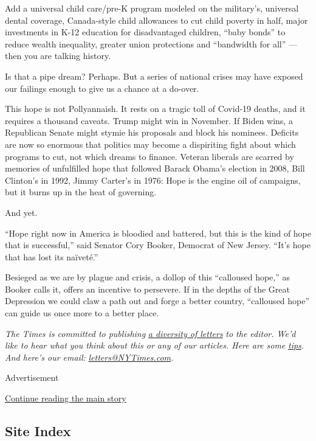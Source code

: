 Add a universal child care/pre-K program modeled on the military's,
universal dental coverage, Canada-style child allowances to cut child
poverty in half, major investments in K-12 education for disadvantaged
children, ``baby bonds'' to reduce wealth inequality, greater union
protections and ``bandwidth for all'' --- then you are talking history.

Is that a pipe dream? Perhaps. But a series of national crises may have
exposed our failings enough to give us a chance at a do-over.

This hope is not Pollyannaish. It rests on a tragic toll of Covid-19
deaths, and it requires a thousand caveats. Trump might win in November.
If Biden wins, a Republican Senate might stymie his proposals and block
his nominees. Deficits are now so enormous that politics may become a
dispiriting fight about which programs to cut, not which dreams to
finance. Veteran liberals are scarred by memories of unfulfilled hope
that followed Barack Obama's election in 2008, Bill Clinton's in 1992,
Jimmy Carter's in 1976: Hope is the engine oil of campaigns, but it
burns up in the heat of governing.

And yet.

``Hope right now in America is bloodied and battered, but this is the
kind of hope that is successful,'' said Senator Cory Booker, Democrat of
New Jersey. ``It's hope that has lost its naïveté.''

Besieged as we are by plague and crisis, a dollop of this ``calloused
hope,'' as Booker calls it, offers an incentive to persevere. If in the
depths of the Great Depression we could claw a path out and forge a
better country, ``calloused hope'' can guide us once more to a better
place.

\emph{The Times is committed to publishing}
\href{https://www.nytimes3xbfgragh.onion/2019/01/31/opinion/letters/letters-to-editor-new-york-times-women.html}{\emph{a
diversity of letters}} \emph{to the editor. We'd like to hear what you
think about this or any of our articles. Here are some}
\href{https://help.nytimes3xbfgragh.onion/hc/en-us/articles/115014925288-How-to-submit-a-letter-to-the-editor}{\emph{tips}}\emph{.
And here's our email:}
\href{mailto:letters@NYTimes.com}{\emph{letters@NYTimes.com}}\emph{.}

Advertisement

\protect\hyperlink{after-bottom}{Continue reading the main story}

\hypertarget{site-index}{%
\subsection{Site Index}\label{site-index}}

